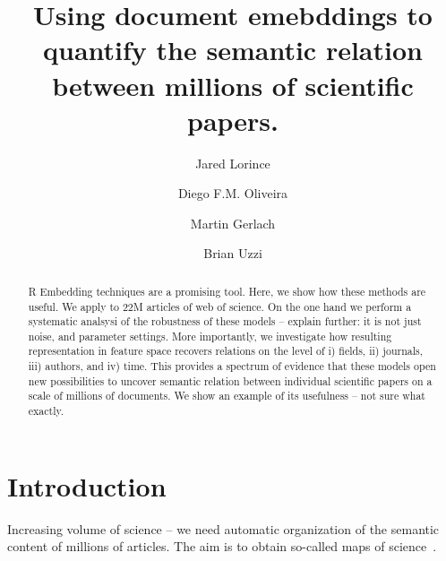 \documentclass[aps,pre,twocolumn,superscriptaddress]{revtex4-1}
\begin{document}
\title{Using document emebddings to quantify the semantic relation between millions of scientific papers. }



\author{Jared Lorince} 

\author{Diego F.M. Oliveira} 

\author{Martin Gerlach} 

\author{Brian Uzzi}

\begin{abstract}
%
R
Embedding techniques are a promising tool.
Here, we show how these methods are useful.
We apply to 22M articles of web of science.
On the one hand we perform a systematic analsysi of the robustness of these models -- explain further: it is not just noise, and parameter settings.
More importantly, we investigate how resulting representation in feature space recovers relations on the level of 
i) fields, ii) journals, iii) authors, and iv) time.
This provides a spectrum of evidence that these models open new possibilities to uncover semantic relation between individual scientific papers on a scale of millions of documents.
We show an example of its usefulness -- not sure what exactly.


\end{abstract} 

\maketitle

\section{Introduction}
\label{sec.intro}
%
Increasing volume of science -- we need automatic organization of the semantic content of millions of articles.
The aim is to obtain so-called maps of science~\cite{Shiffrin2004,Boyack2005,Rosvall2008}.
\end{document}
